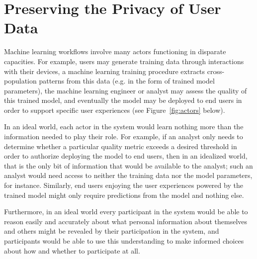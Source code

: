 
\section{Preserving the Privacy of User Data}
\label{sec:privacy}

\begin{figure}[b!] 
\noindent\usebox{\actorsfigure}
\end{figure}


Machine learning workflows involve many actors functioning in disparate capacities.  For example, users may generate training data through interactions with their devices, a machine learning training procedure extracts cross-population patterns from this data (e.g. in the form of trained model parameters), the machine learning engineer or analyst may assess the quality of this trained model, and eventually the model may be deployed to end users in order to support specific user experiences (see Figure~\ref{fig:actors} below).  

In an ideal world, each actor in the system would learn nothing more than the information needed to play their role.  For example, if an analyst only needs to determine whether a particular quality metric exceeds a desired threshold in order to authorize deploying the model to end users, then in an idealized world, that is the only bit of information that would be available to the analyst; such an analyst would need access to neither the training data nor the model parameters, for instance.  Similarly, end users enjoying the user experiences powered by the trained model might only require predictions from the model and nothing else.

Furthermore, in an ideal world every participant in the system would be able to reason easily and accurately about what personal information about themselves and others might be revealed by their participation in the system, and participants would be able to use this understanding to make informed choices about how and whether to participate at all.

